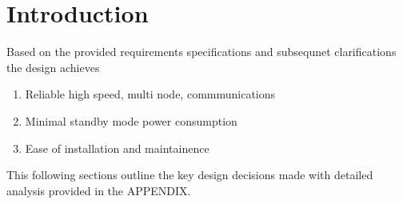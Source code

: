 \section{Introduction}

Based on the provided requirements specifications and subsequnet clarifications the design achieves

\begin{enumerate}
	\item Reliable high speed, multi node, commmunications
	\item Minimal standby mode power consumption
	\item Ease of installation and maintainence 
\end{enumerate}

This following sections outline the key design decisions made with detailed analysis provided in the APPENDIX. 
